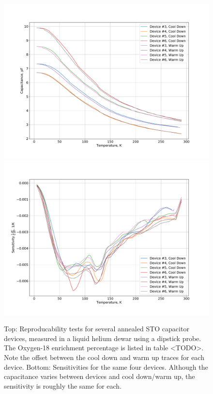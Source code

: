 \documentclass{thesis-umich}
\begin{document}
\begin{figure} \caption[Annealed STO thermometer reproducability tests]{Top: Reproducability tests for several annealed STO
	capacitor devices, measured in a liquid helium dewar using a dipstick
probe. The Oxygen-18 enrichment percentage is listed in table <TODO>. Note the
offset between the cool down and warm up traces for each device. Bottom:
Sensitivities for the same four devices. Although the capacitance varies
between devices and cool down/warm up, the sensitivity is roughly the same for
each.} \includegraphics[width=0.9\columnwidth]{figures/annealed_sto_c_vs_t.pdf}
\includegraphics[width=0.9\columnwidth]{figures/annealed_sto_sens_vs_t.pdf}
\end{figure}
\end{document}
